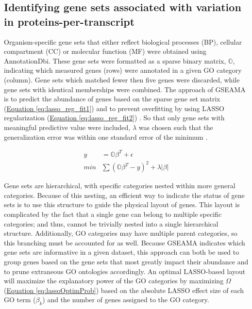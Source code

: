 \subsection{Identifying gene sets associated with variation in proteins-per-transcript}

Organism-specific gene sets that either reflect biological processes (BP), cellular compartment (CC) or molecular function (MF) were obtained using AnnotationDbi\cite{Pages:2008us}. These gene sets were formatted as a sparse binary matrix, $\mathbb{O}$, indicating which measured genes (rows) were annotated in a given GO category (column). Gene sets which matched fewer then five genes were discarded, while gene sets with identical memberships were combined. The approach of GSEAMA is to predict the abundance of genes based on the sparse gene set matrix (\hyperref[eq:lasso_reg_fit1]{Equation \ref{eq:lasso_reg_fit1}}) and to prevent overfitting by using LASSO regularization (\hyperref[eq:lasso_reg_fit2]{Equation \ref{eq:lasso_reg_fit2}}) \cite{Tibshirani:1996wb}. So that only gene sets with meaningful predictive value were included, $\lambda$ was chosen such that the generalization error was within one standard error of the minimum \cite{Friedman:2009ub}.

\begin{subequations}
\begin{align}
y &= \mathbb{O}\beta^{T} + \epsilon\label{eq:lasso_reg_fit1}\\
min &\sum\left(\mathbb{O}\beta^{T} - y\right)^{2} + \lambda |\beta |\label{eq:lasso_reg_fit2}
\end{align}
\end{subequations}

Gene sets are hierarchical, with specific categories nested within more general categories. Because of this nesting, an efficient way to indicate the status of gene sets is to use this structure to guide the physical layout of genes. This layout is complicated by the fact that a single gene can belong to multiple specific categories; and thus, cannot be trivially nested into a single hierarchical structure. Additionally, GO categories may have multiple parent categories, so this branching must be accounted for as well. Because GSEAMA indicates which gene sets are informative in a given dataset, this approach can both be used to group genes based on the gene sets that most greatly impact their abundance and to prune extraneous GO ontologies accordingly. An optimal LASSO-based layout will maximize the explanatory power of the GO categories by maximizing $\Omega$ (\hyperref[eq:lassoOptimProb]{Equation \ref{eq:lassoOptimProb}}) based on the absolute LASSO effect size of each GO term ($\beta_{k}$) and the number of genes assigned to the GO category.

